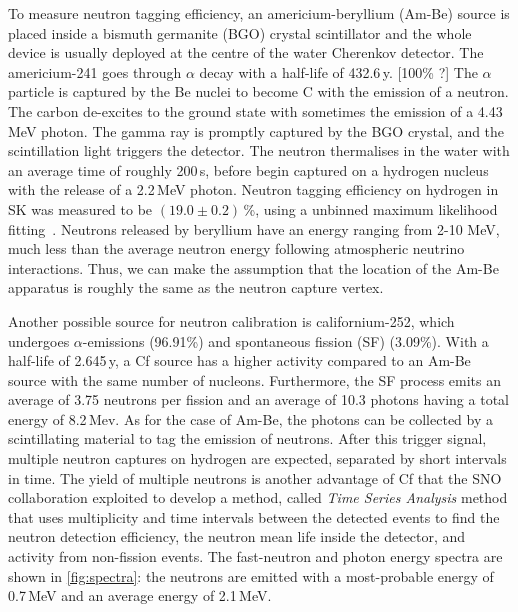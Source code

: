 To measure neutron tagging efficiency, an americium-beryllium (Am-Be) source is placed inside
a bismuth germanite (BGO) crystal scintillator and the whole device is usually deployed %
at the centre of the water Cherenkov detector.
The americium-241 goes through $\alpha$ decay with a half-life of 432.6\,y. [100\% ?]
The $\alpha$ particle is captured by the Be nuclei to become C\tapi{*} with the emission of a neutron.
The carbon de-excites to the ground state with sometimes the emission of a 4.43\,MeV photon.
The gamma ray is promptly captured by the BGO crystal, and the scintillation light triggers the detector.
The neutron thermalises in the water with an average time of roughly 200\,\textmu s, %
before begin captured on a hydrogen nucleus with the release of a 2.2\,MeV photon.
Neutron tagging efficiency on hydrogen in SK was measured to be $(19.0\pm0.2)$\,\%, %
using a unbinned maximum likelihood fitting~\cite{}.
Neutrons released by beryllium have an energy ranging from 2-10 MeV, %
much less than the average neutron energy following atmospheric neutrino interactions.
Thus, we can make the assumption that the location of the Am-Be apparatus is roughly the same %
as the neutron capture vertex.


Another possible source for neutron calibration is californium-252, which %
undergoes $\alpha$-emissions (96.91\%) and spontaneous fission (SF) (3.09\%).
With a half-life of 2.645\,y, a Cf source has a higher activity compared to an Am-Be source %
with the same number of nucleons.
Furthermore, the SF process emits an average of 3.75 neutrons per fission and an average of 10.3 photons %
having a total energy of 8.2\,Mev.
As for the case of Am-Be, the photons can be collected by a scintillating material to tag the %
emission of neutrons.
After this trigger signal, multiple neutron captures on hydrogen are expected, %
separated by short intervals in time.
The yield of multiple neutrons is another advantage of Cf that %
the SNO collaboration exploited to develop a method, called \emph{Time Series Analysis} method that uses %
multiplicity and time intervals between the detected events %
to find the neutron detection efficiency, the neutron mean life inside the detector, %
and activity from non-fission events.
The fast-neutron and photon energy spectra are shown in \ref{fig:spectra}: %
the neutrons are emitted with a most-probable energy of 0.7\,MeV and an average energy of 2.1\,MeV.

